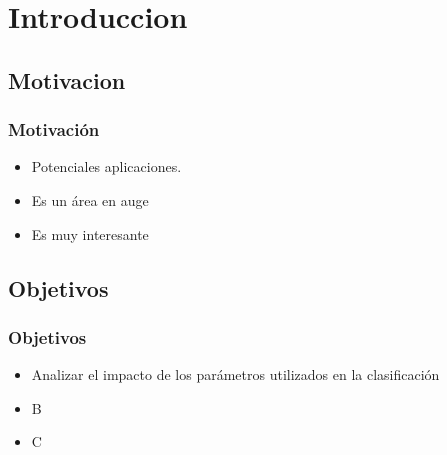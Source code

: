 \section{Introduccion}
	\subsection{Motivacion}
	\begin{frame}
		\frametitle{Motivación}
		\begin{itemize}
			\item Potenciales aplicaciones.
			\pause
			\item Es un área en auge
			\pause
			\item Es muy interesante
		\end{itemize}
	\end{frame}
	\subsection{Objetivos}
	\begin{frame}
		\frametitle{Objetivos}
		\begin{itemize}
			\item Analizar el impacto de los parámetros utilizados en la clasificación
			\item B
			\item C
		\end{itemize}
	\end{frame}